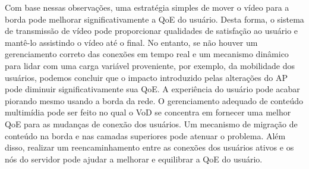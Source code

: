 Com base nessas observações, uma estratégia simples de mover o vídeo para a borda pode melhorar significativamente a QoE do usuário. Desta forma, o sistema de transmissão de vídeo pode proporcionar qualidades de satisfação ao usuário e mantê-lo assistindo o vídeo até o final. No entanto, se não houver um gerenciamento correto das conexões em tempo real e um mecanismo dinâmico para lidar com uma carga variável proveniente, por exemplo, da mobilidade dos usuários, podemos concluir que o impacto introduzido pelas alterações do AP pode diminuir significativamente sua QoE. A experiência do usuário pode acabar piorando mesmo usando a borda da rede. O gerenciamento adequado de conteúdo multimídia pode ser feito no qual o VoD se concentra em fornecer uma melhor QoE para as mudanças de conexão dos usuários. Um mecanismo de migração de conteúdo na borda e nas camadas superiores pode atenuar o problema. Além disso, realizar um reencaminhamento entre as conexões dos usuários ativos e os nós do servidor pode ajudar a melhorar e equilibrar a QoE do usuário.